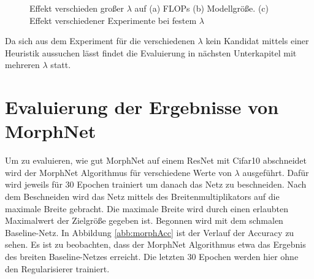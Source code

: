 \begin{figure}
     \centering
     \hfill
     \caption{Effekt verschieden großer $\lambda$ auf  (a) FLOPs (b) Modellgröße. (c) Effekt verschiedener Experimente bei festem $\lambda$ }
     \label{abb:morph2}
\end{figure}
Da sich aus dem Experiment für die verschiedenen $\lambda$ kein Kandidat mittels einer Heuristik aussuchen lässt findet die Evaluierung in nächsten Unterkapitel mit mehreren $\lambda$ statt.


\section{Evaluierung der Ergebnisse von MorphNet}

Um zu evaluieren, wie gut MorphNet auf einem ResNet mit Cifar10 abschneidet wird der MorphNet Algorithmus für verschiedene Werte von $\lambda$ ausgeführt. Dafür wird jeweils für 30 Epochen trainiert um danach das Netz zu beschneiden. Nach dem Beschneiden wird das Netz mittels des Breitenmultiplikators auf die maximale Breite gebracht. Die maximale Breite wird durch einen erlaubten Maximalwert der Zielgröße gegeben ist. Begonnen wird mit dem schmalen Baseline-Netz. In Abbildung \ref{abb:morphAcc} ist der Verlauf der Accuracy zu sehen. Es ist zu beobachten, dass der MorphNet Algorithmus etwa das Ergebnis des breiten Baseline-Netzes erreicht. Die letzten 30 Epochen werden hier ohne den Regularisierer trainiert. 

